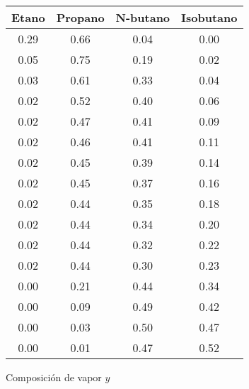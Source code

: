 \begin{figure}[H]
    \centering
    \caption{Composición de vapor $y$}
    \small
    \begin{tabular}{|c|c|c|c|}
        \hline
        \textbf{Etano} & \textbf{Propano} & \textbf{N-butano} & \textbf{Isobutano} \\
        \hline
        0.29           & 0.66             & 0.04              & 0.00               \\
        \hline
        0.05           & 0.75             & 0.19              & 0.02               \\
        \hline
        0.03           & 0.61             & 0.33              & 0.04               \\
        \hline
        0.02           & 0.52             & 0.40              & 0.06               \\
        \hline
        0.02           & 0.47             & 0.41              & 0.09               \\
        \hline
        0.02           & 0.46             & 0.41              & 0.11               \\
        \hline
        0.02           & 0.45             & 0.39              & 0.14               \\
        \hline
        0.02           & 0.45             & 0.37              & 0.16               \\
        \hline
        0.02           & 0.44             & 0.35              & 0.18               \\
        \hline
        0.02           & 0.44             & 0.34              & 0.20               \\
        \hline
        0.02           & 0.44             & 0.32              & 0.22               \\
        \hline
        0.02           & 0.44             & 0.30              & 0.23               \\
        \hline
        0.00           & 0.21             & 0.44              & 0.34               \\
        \hline
        0.00           & 0.09             & 0.49              & 0.42               \\
        \hline
        0.00           & 0.03             & 0.50              & 0.47               \\
        \hline
        0.00           & 0.01             & 0.47              & 0.52               \\
        \hline

\end{tabular}
\end{figure}
